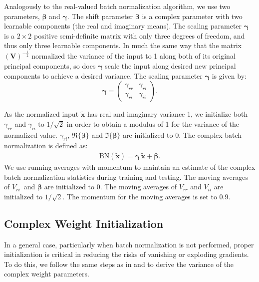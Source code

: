 \documentclass{article}
\begin{document}
Analogously to the real-valued batch normalization algorithm, we use two parameters, $\boldsymbol \beta$ and $\boldsymbol \gamma$. The shift parameter $\boldsymbol \beta$ is a complex parameter with two learnable components (the real and imaginary means). The scaling parameter $\boldsymbol \gamma$ is a $2 \times 2$ positive semi-definite matrix with only three degrees of freedom, and thus only three learnable components. In much the same way that the matrix $(\boldsymbol V)^{-\frac{1}{2}}$ normalized the variance of the input to 1 along both of its original principal components, so does $\boldsymbol \gamma$ scale the input along desired new principal components to achieve a desired variance. The scaling parameter $\boldsymbol \gamma$ is given by:
$$\boldsymbol{\gamma} = \left ( \begin{array}{cc} \gamma_{rr}  & \gamma_{ri} \\ \gamma_{ri} & \gamma_{ii} \end{array} \right).$$

As the normalized input $\tilde{\boldsymbol x}$ has real and imaginary variance 1, we initialize both $\gamma_{rr}$
and $\gamma_{ii}$ to $1 / \sqrt{2}$ in order to obtain a modulus of 1 for the variance of the normalized value. $\gamma_{ri}$, $\Re\{\boldsymbol \beta\}$ and $\Im\{\boldsymbol \beta\}$ are initialized to 0. 
The complex batch normalization is defined as:
\begin{equation}\label{Complex_Batchnorm}
\begin{aligned}
\mathrm{BN} \left( \tilde{\boldsymbol x} \right) = \boldsymbol \gamma \, \tilde{\boldsymbol x} + \boldsymbol \beta.
\end{aligned}
\end{equation}
We use running averages with momentum to maintain an estimate of the complex batch normalization statistics during training and testing. The moving averages of $V_{ri} \,$ and $\boldsymbol \beta$ are initialized to 0. The moving averages of $V_{rr}$ and $V_{ii}$ are initialized to $1 /{\sqrt{2}}$. The momentum for the moving averages is set to 0.9.

\subsection{Complex Weight Initialization}
\label{sec:complex_init}
In a general case, particularly when batch normalization is not performed, proper initialization is critical in reducing the risks of vanishing or exploding gradients. To do this, we follow the same steps as in \citet{glorot2010understanding} and \citet{he2015delving} to derive the variance of the complex weight parameters.
\end{document}
